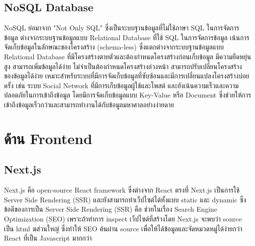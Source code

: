 \subsection{NoSQL Database}
NoSQL ย่อมาจาก "Not Only SQL" ซึ่งเป็นระบบฐานข้อมูลที่ไม่ใช้ภาษา SQL ในการจัดการข้อมูล ต่างจากระบบฐานข้อมูลแบบ Relational Database ที่ใช้ SQL ในการจัดการข้อมูล
เน้นการจัดเก็บข้อมูลในลักษณะของโครงสร้าง (schema-less) ซึ่งแตกต่างจากระบบฐานข้อมูลแบบ Relational Database ที่มีโครงสร้างตายตัวและต้องกำหนดโครงสร้างก่อนเก็บข้อมูล
มีความยืดหยุ่นสูง สามารถเพิ่มข้อมูลได้ง่าย ไม่จำเป็นต้องกำหนดโครงสร้างล่วงหน้า สามารถปรับเปลี่ยนโครงสร้างของข้อมูลได้ง่าย เหมาะสำหรับระบบที่มีการจัดเก็บข้อมูลที่ซับซ้อนและมีการเปลี่ยนแปลงโครงสร้างบ่อยครั้ง เช่น ระบบ Social Network ที่มีการเก็บข้อมูลผู้ใช้และโพสต์
และยังเน้นความเร็วและความปลอดภัยในการเข้าถึงข้อมูล โดยมีการจัดเก็บข้อมูลแบบ Key-Value หรือ Document ซึ่งช่วยให้การเข้าถึงข้อมูลเร็วกว่าและสามารถทำงานได้กับข้อมูลมหาศาลอย่างง่ายดาย\cite{NoSQL}




\section{ด้าน Frontend}

\subsection{Next.js}
Next.js คือ open-source React framework ซึ่งต่างจาก React ตรงที่ Next.js เป็นการใช้ Server Side Rendering (SSR) และยังสามารถทำเว็ปไซต์ได้ทั้งแบบ static และ dynamic 
\enskip
ซึ่งข้อดีของการเป็น Server Side Rendering (SSR) คือ ช่วยในเรื่อง Search Engine Optimization (SEO) เพราะถ้าทำการ inspect เว็ปไซต์ที่สร้างโดย Next.js จะพบว่า source เป็น html ฆส่วนใหญ่ ซึ่งทำให้ SEO ค้นผ่าน source เพื่อให้ได้ข้อมูลและจัดหมวดหมู่ได้ง่ายกว่า React ที่เป็น Javascript มากกว่า

